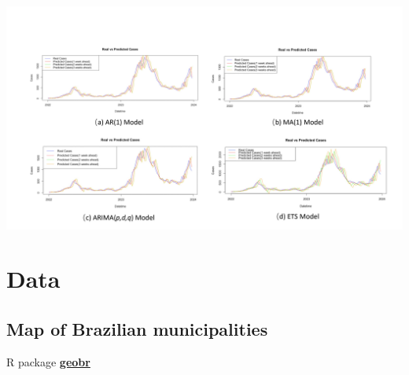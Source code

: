 \documentclass[
  letterpaper,
  DIV=11,
  numbers=noendperiod]{scrreprt}
\newenvironment{Shaded}{\begin{snugshade}}{\end{snugshade}}
\newcommand{\AttributeTok}[1]{\textcolor[rgb]{0.40,0.45,0.13}{#1}}
\newcommand{\CommentTok}[1]{\textcolor[rgb]{0.37,0.37,0.37}{#1}}
\newcommand{\ConstantTok}[1]{\textcolor[rgb]{0.56,0.35,0.01}{#1}}
\newcommand{\DecValTok}[1]{\textcolor[rgb]{0.68,0.00,0.00}{#1}}
\newcommand{\FunctionTok}[1]{\textcolor[rgb]{0.28,0.35,0.67}{#1}}
\newcommand{\NormalTok}[1]{\textcolor[rgb]{0.00,0.23,0.31}{#1}}
\newcommand{\OtherTok}[1]{\textcolor[rgb]{0.00,0.23,0.31}{#1}}
\newcommand{\SpecialCharTok}[1]{\textcolor[rgb]{0.37,0.37,0.37}{#1}}
\newcommand{\StringTok}[1]{\textcolor[rgb]{0.13,0.47,0.30}{#1}}
\begin{document}
\includegraphics[width=6.25in,height=\textheight]{img/denguebrazil-realvsforecasts.jpg}

\hypertarget{data-2}{%
\chapter{Data}\label{data-2}}

\hypertarget{map-of-brazilian-municipalities}{%
\section{Map of Brazilian
municipalities}\label{map-of-brazilian-municipalities}}

R package
\href{https://cran.r-project.org/web/packages/geobr/vignettes/intro_to_geobr.html}{\textbf{geobr}}

\begin{Shaded}
\end{Shaded}
\end{document}
